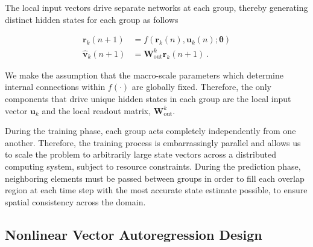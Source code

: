 \documentclass[draft]{agujournal2019}
\newcommand{\state}{\mathbf{v}}
\newcommand{\hidden}{\mathbf{r}}
\newcommand{\inputstate}{\mathbf{u}}
\newcommand{\hiddenlayer}{f}
\newcommand{\hyperparameters}{\bm{\theta}}
\newcommand{\Wout}{\mathbf{W}_\text{out}}
\newcommand{\localWout}{\Wout^{k}}
\newcommand{\localhidden}{\hidden_{k}}
\newcommand{\localinputstate}{\inputstate_{k}}
\newcommand{\localoutput}{\hat{\state}_{k}}
\begin{document}
The local input vectors drive separate networks at each group, thereby generating distinct hidden states for each group as follows
\begin{linenomath*}\begin{equation}
    \begin{aligned}
        \localhidden(n+1)
        &= \hiddenlayer\left(
            \localhidden(n), \localinputstate(n); \hyperparameters
        \right) \\
        \localoutput(n+1)
        &= \localWout \localhidden(n+1) \, .
    \end{aligned}
    \label{eq:local-rnn}
\end{equation}\end{linenomath*}
We make the assumption that the macro-scale parameters which determine internal
connections within $\hiddenlayer(\cdot)$ are globally fixed.
Therefore, the only components
that drive unique hidden states in each group are the local input vector
$\localinputstate$ and the local readout matrix, $\localWout$.

During the training phase, each group acts completely independently from one
another.
Therefore, the training process is embarrassingly parallel and allows us to
scale the problem to arbitrarily large state vectors across a distributed
computing system, subject to resource constraints.
During the prediction phase, neighboring elements must be passed between
groups in order to fill each overlap region at each time step with the most accurate state estimate possible, to ensure spatial consistency across the domain.

\subsection{Nonlinear Vector Autoregression Design}
\label{subsec:nvar}
\end{document}
